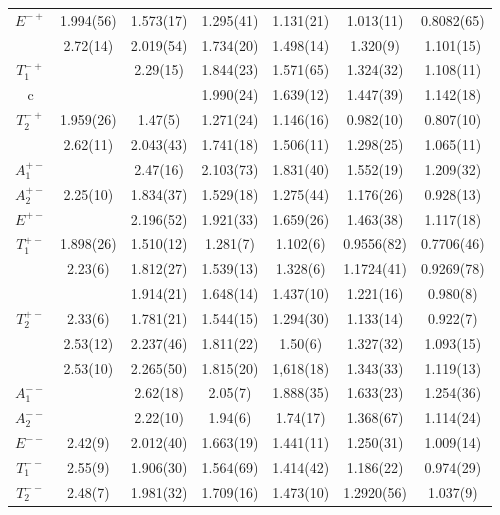 \documentclass[12pt]{article}
\begin{document}
\begin{table}[htb]
\begin{tabular}{|c|c|c|c|c|c|c|}
$E^{-+}$   & 1.994(56) & 1.573(17) & 1.295(41)  & 1.131(21) & 1.013(11)  & 0.8082(65)   \\
          & 2.72(14)  & 2.019(54)  & 1.734(20) & 1.498(14) & 1.320(9)   & 1.101(15)  \\ \hline
$T^{-+}_1$ &           & 2.29(15)  & 1.844(23)  & 1.571(65) & 1.324(32)  & 1.108(11)   \\ \hline
c          &           &           & 1.990(24)  & 1.639(12) & 1.447(39)  & 1.142(18)  \\ \hline
$T^{-+}_2$ & 1.959(26)  & 1.47(5)  & 1.271(24)  & 1.146(16) & 0.982(10)  & 0.807(10)  \\
          & 2.62(11)  & 2.043(43) & 1.741(18)  & 1.506(11) & 1.298(25)  & 1.065(11)  \\ \hline
$A^{+-}_1$ &          & 2.47(16)  & 2.103(73)  & 1.831(40) & 1.552(19)  & 1.209(32)   \\ \hline
$A^{+-}_2$ &  2.25(10) & 1.834(37)  & 1.529(18) & 1.275(44) & 1.176(26)  & 0.928(13)   \\ \hline
$E^{+-}$   &           & 2.196(52) & 1.921(33) & 1.659(26) & 1.463(38) & 1.117(18)    \\ \hline
$T^{+-}_1$ & 1.898(26)  & 1.510(12)  & 1.281(7)  & 1.102(6) & 0.9556(82)  & 0.7706(46)   \\
          & 2.23(6)   & 1.812(27)  & 1.539(13)  & 1.328(6) & 1.1724(41)  & 0.9269(78)   \\
          &          & 1.914(21)  & 1.648(14)  & 1.437(10) & 1.221(16)  & 0.980(8)   \\ \hline
$T^{+-}_2$ & 2.33(6)  & 1.781(21)  & 1.544(15)  & 1.294(30) & 1.133(14)  & 0.922(7)   \\
          & 2.53(12) & 2.237(46)  & 1.811(22)  & 1.50(6)  & 1.327(32)  &  1.093(15)  \\
          & 2.53(10) & 2.265(50)  & 1.815(20)  & 1,618(18) & 1.343(33) &  1.119(13)  \\ \hline
$A^{--}_1$ &         & 2.62(18)   & 2.05(7)   & 1.888(35) & 1.633(23)  &  1.254(36)  \\ \hline
$A^{--}_2$ &        & 2.22(10)  & 1.94(6)  & 1.74(17)  & 1.368(67)   &  1.114(24) \\ \hline
$E^{--}$   & 2.42(9) & 2.012(40)  & 1.663(19)  & 1.441(11) & 1.250(31)  & 1.009(14)   \\ \hline
$T^{--}_1$ & 2.55(9) & 1.906(30)  & 1.564(69)  & 1.414(42) & 1.186(22)  & 0.974(29)   \\ \hline
$T^{--}_2$ & 2.48(7) & 1.981(32)  & 1.709(16)  & 1.473(10) & 1.2920(56) & 1.037(9)  \\

\end{tabular}
\end{table}
\end{document}
